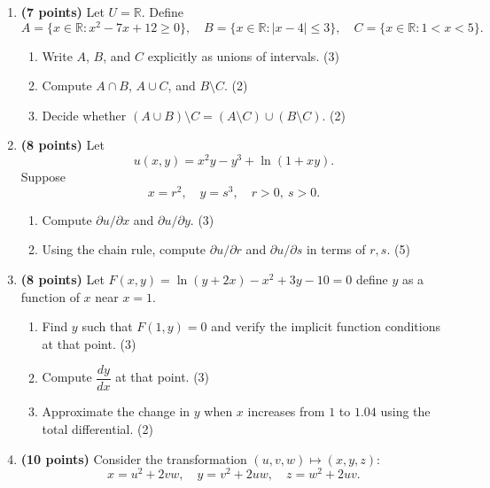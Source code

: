 \documentclass[12pt]{article}
\begin{document}
\begin{enumerate}

\vspace{.7cm}
\item\textbf{ (7 points)} Let $U=\mathbb{R}$. Define
\[
A=\{x\in\mathbb{R}: x^2-7x+12\ge 0\}, \quad
B=\{x\in\mathbb{R}: |x-4|\le 3\}, \quad
C=\{x\in\mathbb{R}: 1<x<5\}.
\]

\begin{enumerate}[label=(\alph*)]
\item Write $A$, $B$, and $C$ explicitly as unions of intervals. \hfill (3)
\item Compute $A\cap B$, $A\cup C$, and $B\setminus C$. \hfill (2)
\item Decide whether $(A\cup B)\setminus C=(A\setminus C)\cup(B\setminus C)$. \hfill (2)
\end{enumerate}

\vspace{1cm}

\item \textbf{(8 points)} Let
\[
u(x,y)=x^2y - y^3 + \ln(1+xy).
\]
Suppose
\[
x = r^2,\quad y = s^3,\quad r>0,\ s>0.
\]

\begin{enumerate}[label=(\alph*)]
\item Compute $\partial u/\partial x$ and $\partial u/\partial y$. \hfill (3)
\item Using the chain rule, compute $\partial u/\partial r$ and $\partial u/\partial s$ in terms of $r,s$. \hfill (5)
\end{enumerate}
\vspace{1cm}
 \item \textbf{(8 points)} Let $F(x,y)=\ln(y+2x)-x^2+3y-10=0$ define $y$ as a function of $x$ near $x=1$.

\begin{enumerate}[label=(\alph*)]
\item Find $y$ such that $F(1,y)=0$ and verify the implicit function conditions at that point. \hfill (3)
\item Compute $\dfrac{dy}{dx}$ at that point. \hfill (3)
\item Approximate the change in $y$ when $x$ increases from $1$ to $1.04$ using the total differential. \hfill (2)
\end{enumerate}
\newpage
\item \textbf{(10 points)} Consider the transformation $(u,v,w)\mapsto(x,y,z)$:
\[
x = u^2 + 2vw,\quad
y = v^2 + 2uw,\quad
z = w^2 + 2uv.
\]


\end{enumerate}
\end{document}
